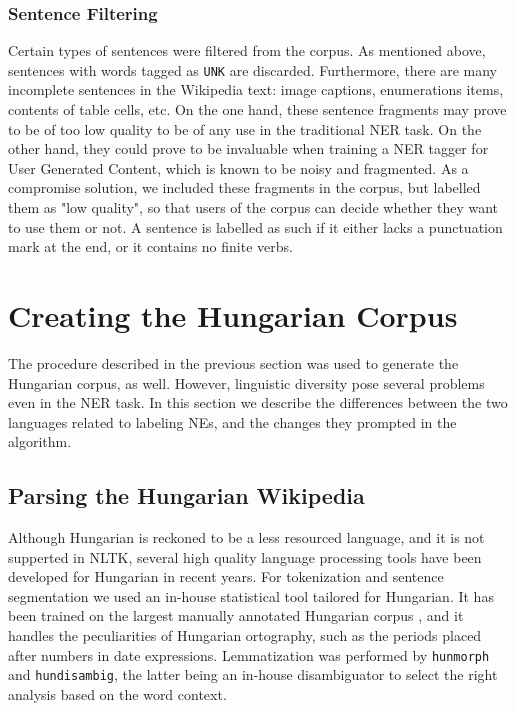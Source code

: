 \documentclass[11pt]{article}
\begin{document}
\subsubsection{Sentence Filtering}

Certain types of sentences were filtered from the corpus. As mentioned above, sentences with words tagged as \texttt{UNK} are discarded. Furthermore, there are many incomplete sentences in the Wikipedia text: image captions, enumerations items, contents of table cells, etc. On the one hand, these sentence fragments may prove to be of too low quality to be of any use in the traditional NER task. On the other hand, they could prove to be invaluable when training a NER tagger for User Generated Content, which is known to be noisy and fragmented. As a compromise solution, we included these fragments in the corpus, but labelled them as "low quality", so that users of the corpus can decide whether they want to use them or not. A sentence is labelled as such if it either lacks a punctuation mark at the end, or it contains no finite verbs.

\section{Creating the Hungarian Corpus}
\label{sec:hun}

The procedure described in the previous section was used to generate the Hungarian corpus, as well. However, linguistic diversity pose several problems even in the NER task. In this section we describe the differences between the two languages related to labeling NEs, and the changes they prompted in the algorithm.

\subsection{Parsing the Hungarian Wikipedia}

Although Hungarian is reckoned to be a less resourced language, and it is not supperted in NLTK, several high quality language processing tools have been developed for Hungarian in recent years. For tokenization and sentence segmentation we used an in-house statistical tool tailored for Hungarian. It has been trained on the largest manually annotated Hungarian corpus \cite{Csendes:04}, and it handles the peculiarities of Hungarian ortography, such as the periods placed after numbers in date expressions. Lemmatization was performed by \texttt{hunmorph} \cite{Tron:05} and \texttt{hundisambig}, the latter being an in-house disambiguator to select the right analysis based on the word context. 
\end{document}
